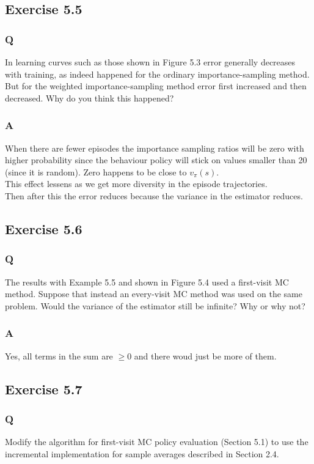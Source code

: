 \subsection{Exercise 5.5}
\subsubsection{Q}
In learning curves such as those shown in Figure 5.3 error generally decreases with training, as indeed happened for the ordinary importance-sampling method. But for the weighted importance-sampling method error first increased and then decreased. Why do you think this happened?

\subsubsection{A}
When there are fewer episodes the importance sampling ratios will be zero with higher probability since the behaviour policy will stick on values smaller than 20 (since it is random). Zero happens to be close to $v_\pi(s)$.\\

This effect lessens as we get more diversity in the episode trajectories.\\

Then after this the error reduces because the variance in the estimator reduces.

\subsection{Exercise 5.6}
\subsubsection{Q}
The results with Example 5.5 and shown in Figure 5.4 used a first-visit MC method. Suppose that instead an every-visit MC method was used on the same problem. Would the variance of the estimator still be infinite? Why or why not?
\subsubsection{A}
Yes, all terms in the sum are $\geq 0$ and there woud just be more of them.

\subsection{Exercise 5.7}
\subsubsection{Q}
Modify the algorithm for first-visit MC policy evaluation (Section 5.1) to use the incremental implementation for sample averages described in Section 2.4.

